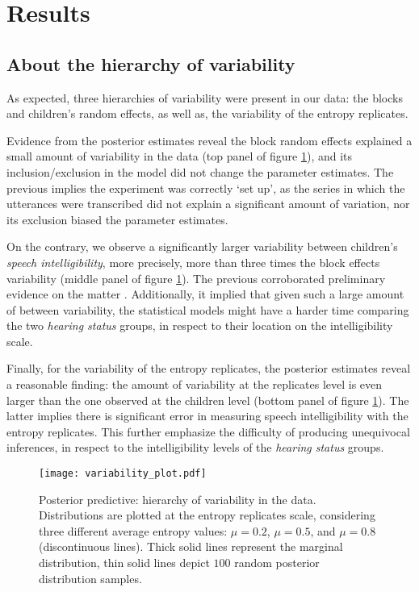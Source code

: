 \section{Results} \label{S:results}
%
\subsection{About the hierarchy of variability} \label{sS:results_variability}
%
As expected, three hierarchies of variability were present in our data: the blocks and children's random effects, as well as, the variability of the entropy replicates.

Evidence from the posterior estimates reveal the block random effects explained a small amount of variability in the data (top panel of figure \ref{fig:variability}), and its inclusion/exclusion in the model did not change the parameter estimates. The previous implies the experiment was correctly `set up', as the series in which the utterances were transcribed did not explain a significant amount of variation, nor its exclusion biased the parameter estimates.

On the contrary, we observe a significantly larger variability between children's \textit{speech intelligibility}, more precisely, more than three times the block effects variability (middle panel of figure \ref{fig:variability}). The previous corroborated preliminary evidence on the matter \cite{Young_et_al_2002, Peng_et_al_2004, Montag_et_al_2014, Castellanos_et_al_2014, Yanbay_et_al_2014, Nittrouer_et_al_2014, Freeman_et_al_2017, Boonen_et_al_2021}. Additionally, it implied that given such a large amount of between variability, the statistical models might have a harder time comparing the two \textit{hearing status} groups, in respect to their location on the intelligibility scale.

Finally, for the variability of the entropy replicates, the posterior estimates reveal a reasonable finding: the amount of variability at the replicates level is even larger than the one observed at the children level (bottom panel of figure \ref{fig:variability}). The latter implies there is significant error in measuring speech intelligibility with the entropy replicates. This further emphasize the difficulty of producing unequivocal  inferences, in respect to the intelligibility levels of the \textit{hearing status} groups.
%
\begin{figure}[!h]
	\centering
	\texttt{[image: variability\_plot.pdf]}
	\caption[Posterior predictive: hierarchy of variability in the data]{Posterior predictive: hierarchy of variability in the data. Distributions are plotted at the entropy replicates scale, considering three different average entropy values: $\mu=0.2$, $\mu=0.5$, and $\mu=0.8$ (discontinuous lines). Thick solid lines represent the marginal distribution, thin solid lines depict $100$ random posterior distribution samples.}
	\label{fig:variability}
\end{figure}
%
